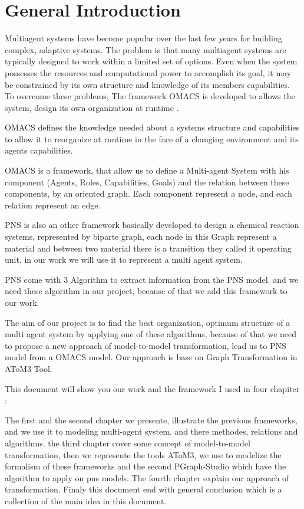 \chapter*{General Introduction}

\textbf{}



Multiagent systems have become popular over the last few years for building complex, adaptive systems. 
The problem is that many multiagent systems are typically designed to work within 
a limited set of options. Even when the system possesses the resources and
computational power to accomplish its goal, it may be constrained by its own structure and knowledge
of its members capabilities. To overcome these problems, The framework OMACS is developed to allows the system, design its own organization at runtime \cite{omacs4}.

OMACS defines the knowledge needed about a systems structure and capabilities to allow it to reorganize at runtime in the face of a changing environment and its agents capabilities\cite{omacs4}\cite{omacs2}.

OMACS is a framework, that allow us to define a Multi-agent System with his component (Agents, Roles, Capabilities, Goals) and the relation between these components, 
by an oriented graph. Each component represent a node, and each relation represent an edge.
 
PNS is also an other framework basically developed to design a chemical reaction systems, represented by biparte graph, each node in this Graph represent a material and between two material there is a transition they called it operating unit, in our work we will use it to represent a multi agent system. 

PNS come with 3 Algorithm to extract information from the PNS model. and we need these algorithm in our project, because of that we add this framework 
to our work.

The aim of our project is to find the best organization, optimum structure of a multi agent system by applying one of these algorithms, 
because of that we need to propose a new approach of model-to-model transformation, lead us to PNS model from a OMACS model. Our approach is base on Graph Transformation in AToM3 Tool.

This document will show you our work and the framework I used in four chapiter : 

The first and the second chapter we presente, illustrate the previous frameworks, and we use it to modeling multi-agent system. and there methodes, relations and algorithms.
the third chapter cover some concept of model-to-model transformation, then we represente the tools AToM3, we use to modelize the formalism of these frameworks and the second PGraph-Studio which have the algorithm to apply on pns models. 
The fourth chapter explain our approach of transformation. 
Finaly this document end with general conclusion which is a collection of the main idea in this document.

 



